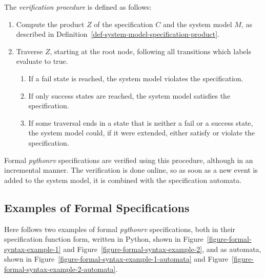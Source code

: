\begin{mydef}\label{def-verification-procedure}
The \textit{verification procedure} is defined as follows:

\begin{enumerate}
  \item Compute the product $Z$ of the specification $C$ and the system model
    $M$, as described in
    Definition~\ref{def-system-model-specification-product}.

  \item Traverse $Z$, starting at the root node, following all transitions
    which labels evaluate to true.

    \begin{enumerate}
      \item If a fail state is reached, the system model violates the
        specification.
      \item If only success states are reached, the system model satisfies the
        specification.
      \item If some traversal ends in a state that is neither a fail or a
        success state, the system model could, if it were extended, either
        satisfy or violate the specification.
    \end{enumerate}
\end{enumerate}

\end{mydef}

Formal \textit{pythonrv} specifications are verified using this procedure,
although in an incremental manner. The verification is done online, so as soon
as a new event is added to the system model, it is combined with the
specification automata.






\subsection{Examples of Formal Specifications}
\label{section-approach-examples-of-formal-specifications}
\lstset{language=Python,numbers=none}

Here follows two examples of formal \textit{pythonrv} specifications, both in
their specification function form, written in Python, shown in
Figure~\ref{figure-formal-syntax-example-1} and
Figure~\ref{figure-formal-syntax-example-2}, and as automata, shown in
Figure~\ref{figure-formal-syntax-example-1-automata} and
Figure~\ref{figure-formal-syntax-example-2-automata}.

